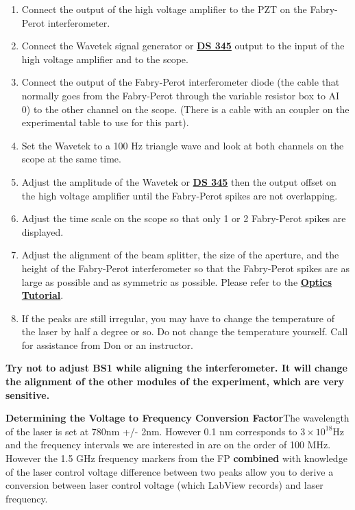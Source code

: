\documentclass{../lab}
\begin{document}
\begin{enumerate}
    \item Connect the output of the high voltage amplifier to the PZT on the Fabry-Perot interferometer.

    \item Connect the Wavetek signal generator or \href{https://youtu.be/PrM8DHFOFS0}{\textbf{DS 345}} output to the input of the high voltage amplifier and to the scope.

    \item Connect the output of the Fabry-Perot interferometer diode (the cable that normally goes from the Fabry-Perot through the variable resistor box to AI 0) to the other channel on the scope. (There is a cable with an coupler on the experimental table to use for this part).

    \item Set the Wavetek to a 100 Hz triangle wave and look at both channels on the scope at the same time.

    \item Adjust the amplitude of the Wavetek or \href{https://youtu.be/PrM8DHFOFS0}{\textbf{\textbf{DS 345}}} then  the output offset on the high voltage amplifier until the Fabry-Perot spikes are not overlapping.

    \item Adjust the time scale on the scope so that only 1 or 2 Fabry-Perot spikes are displayed.

    \item Adjust the alignment of the beam splitter, the size of the aperture, and the height of the Fabry-Perot interferometer so that the Fabry-Perot spikes are as large as possible and as symmetric as possible. Please refer to the \href{http://experimentationlab.berkeley.edu/OpticsTutorial}{\textbf{Optics Tutorial}}.

    \item If the peaks are still irregular, you may have to change the temperature of the laser by half a degree or so. Do not change the temperature yourself. Call for assistance from Don or an instructor.

\end{enumerate}

\textbf{Try not to adjust BS1 while aligning the interferometer. It will change the alignment of the other modules of the experiment, which are very sensitive.}

\textbf{Determining the Voltage to Frequency Conversion Factor}The wavelength of the laser is set at 780nm +/- 2nm. However 0.1 nm corresponds to $3\times10^{18}$Hz and the frequency intervals we are interested in are on the order of 100 MHz. However the 1.5 GHz frequency markers from the FP \textbf{combined} with knowledge of the laser control voltage difference between two peaks allow you to derive a conversion between laser control voltage (which LabView records) and laser frequency.
\end{document}
